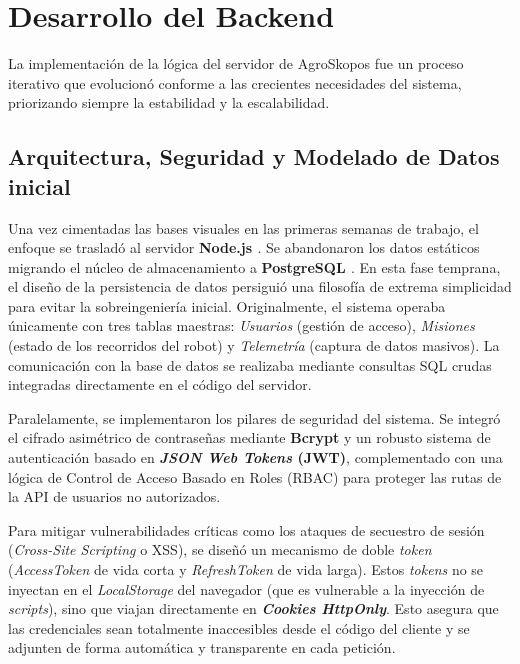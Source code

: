 \section{Desarrollo del Backend}

La implementación de la lógica del servidor de AgroSkopos fue un proceso iterativo que evolucionó conforme a las crecientes necesidades del sistema, priorizando siempre la estabilidad y la escalabilidad.

\subsection{Arquitectura, Seguridad y Modelado de Datos inicial}
Una vez cimentadas las bases visuales en las primeras semanas de trabajo, el enfoque se trasladó al servidor \textbf{Node.js \cite{nodejs}}. Se abandonaron los datos estáticos migrando el núcleo de almacenamiento a \textbf{PostgreSQL \cite{postgresql}}. En esta fase temprana, el diseño de la persistencia de datos persiguió una filosofía de extrema simplicidad para evitar la sobreingeniería inicial. Originalmente, el sistema operaba únicamente con tres tablas maestras: \textit{Usuarios} (gestión de acceso), \textit{Misiones} (estado de los recorridos del robot) y \textit{Telemetría} (captura de datos masivos). La comunicación con la base de datos se realizaba mediante consultas SQL crudas integradas directamente en el código del servidor.

Paralelamente, se implementaron los pilares de seguridad del sistema. Se integró el cifrado asimétrico de contraseñas mediante \textbf{Bcrypt} y un robusto sistema de autenticación basado en \textbf{\textit{JSON Web Tokens} (JWT)}, complementado con una lógica de Control de Acceso Basado en Roles (RBAC) para proteger las rutas de la API de usuarios no autorizados.

Para mitigar vulnerabilidades críticas como los ataques de secuestro de sesión (\textit{Cross-Site Scripting} o XSS), se diseñó un mecanismo de doble \textit{token} (\textit{AccessToken} de vida corta y \textit{RefreshToken} de vida larga). Estos \textit{tokens} no se inyectan en el \textit{LocalStorage} del navegador (que es vulnerable a la inyección de \textit{scripts}), sino que viajan directamente en \textbf{\textit{Cookies HttpOnly}}. Esto asegura que las credenciales sean totalmente inaccesibles desde el código del cliente y se adjunten de forma automática y transparente en cada petición.


